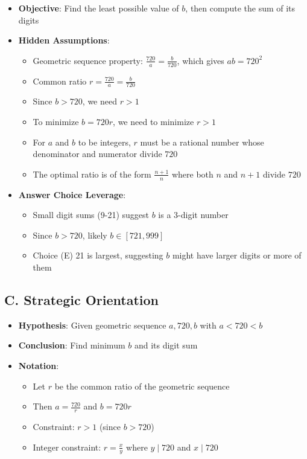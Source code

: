 \documentclass[11pt]{article}
\begin{document}
\begin{problemconfigbox}
\begin{itemize}[leftmargin=*]
    \item \textbf{Objective}: Find the least possible value of $b$, then compute the sum of its digits
    
    \item \textbf{Hidden Assumptions}: 
    \begin{itemize}
        \item Geometric sequence property: $\frac{720}{a} = \frac{b}{720}$, which gives $ab = 720^2$
        \item Common ratio $r = \frac{720}{a} = \frac{b}{720}$
        \item Since $b > 720$, we need $r > 1$
        \item To minimize $b = 720r$, we need to minimize $r > 1$
        \item For $a$ and $b$ to be integers, $r$ must be a rational number whose denominator and numerator divide $720$
        \item The optimal ratio is of the form $\frac{n+1}{n}$ where both $n$ and $n+1$ divide $720$
    \end{itemize}
    
    \item \textbf{Answer Choice Leverage}: 
    \begin{itemize}
        \item Small digit sums (9-21) suggest $b$ is a 3-digit number
        \item Since $b > 720$, likely $b \in [721, 999]$
        \item Choice (E) 21 is largest, suggesting $b$ might have larger digits or more of them
    \end{itemize}
\end{itemize}

\subsection*{C. Strategic Orientation}
\begin{itemize}[leftmargin=*]
    \item \textbf{Hypothesis}: Given geometric sequence $a, 720, b$ with $a < 720 < b$
    \item \textbf{Conclusion}: Find minimum $b$ and its digit sum
    \item \textbf{Notation}: 
    \begin{itemize}
        \item Let $r$ be the common ratio of the geometric sequence
        \item Then $a = \frac{720}{r}$ and $b = 720r$
        \item Constraint: $r > 1$ (since $b > 720$)
        \item Integer constraint: $r = \frac{x}{y}$ where $y \mid 720$ and $x \mid 720$
    \end{itemize}
    

\end{itemize}
\end{problemconfigbox}
\end{document}
